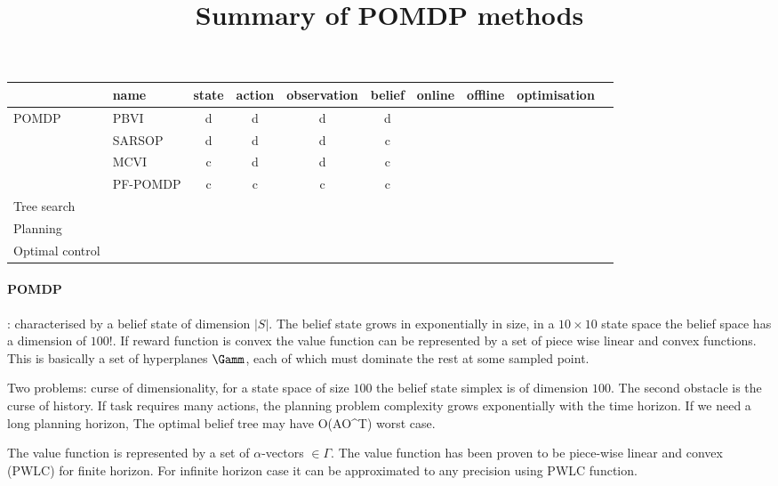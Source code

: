 \documentclass[review]{elsarticle}
\title{Summary of POMDP methods}
\begin{document}
\begin{tabular}{ l|l|c|c|c|c|c|c|c|c| }
\cline{2-9}
				  & name 	    			& state & action & observation & belief	 & online	 & offline	& optimisation\\ \hline
POMDP 			      	  & PBVI\cite{PBVI} 			&  d    &   d    & 	d      & d  	 & \checkmark    &              &  \\ \cline{2-9}
				  & SARSOP\cite{SARSOP}   		&  d 	&   d 	 & 	d      & c       & \checkmark    &		&  \\ \cline{2-9} 
				  & MCVI\cite{MCVI}	   		&  c 	&   d 	 & 	d      & c       &     		 & \checkmark	&  \\ \cline{2-9} 
				  & PF-POMDP\cite{NIPS2008_0628}	&  c 	&   c 	 & 	c      & c       & \checkmark    &		&  \\ \hline 
Tree search		  	  & 					&   	&    	 & 	       &         &     	         &		&  \\ \hline  
Planning		          & 					&   	&    	 & 	       &         &     	         &		&  \\ \hline  
Optimal control			  & 					&   	&    	 & 	       &         &     	         &		&  \\ \hline   
\end{tabular}

\paragraph{POMDP}: characterised by a belief state of dimension $|S|$. The belief state grows in exponentially in size, in a $10 \times 10$
state space the belief space has a dimension of $100!$. If reward function is convex the value function can be represented by a set of piece
wise linear and convex functions. This is basically a set of hyperplanes $\Gamm$, each of which must dominate the rest at some sampled point.


Two problems: curse of dimensionality, for a state space of size $100$ the belief state simplex is of dimension $100$. The second obstacle
is the curse of history. If task requires many actions, the planning problem complexity grows exponentially with the time horizon.
If we need a long planning horizon, The optimal belief tree may have O(AO^T) worst case.


The value function is represented by a set of $\alpha$-vectors $ \in \Gamma$. The value function has been proven to be piece-wise 
linear and convex (PWLC) for finite horizon. For infinite horizon case it can be approximated to any precision using PWLC function.
\end{document}
